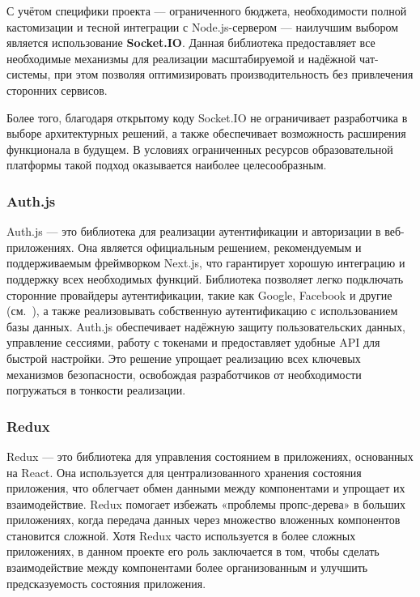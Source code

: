 С учётом специфики проекта — ограниченного бюджета, необходимости полной кастомизации и тесной интеграции с Node.js-сервером — наилучшим выбором является использование \textbf{Socket.IO}. Данная библиотека предоставляет все необходимые механизмы для реализации масштабируемой и надёжной чат-системы, при этом позволяя оптимизировать производительность без привлечения сторонних сервисов.

Более того, благодаря открытому коду Socket.IO не ограничивает разработчика в выборе архитектурных решений, а также обеспечивает возможность расширения функционала в будущем. В условиях ограниченных ресурсов образовательной платформы такой подход оказывается наиболее целесообразным.

\subsubsection*{Auth.js}

Auth.js — это библиотека для реализации аутентификации и авторизации в веб-приложениях. Она является официальным решением, рекомендуемым и поддерживаемым фреймворком Next.js, что гарантирует хорошую интеграцию и поддержку всех необходимых функций. Библиотека позволяет легко подключать сторонние провайдеры аутентификации, такие как Google, Facebook и другие (см.~\cite{nextauth_docs}), а также реализовывать собственную аутентификацию с использованием базы данных. Auth.js обеспечивает надёжную защиту пользовательских данных, управление сессиями, работу с токенами и предоставляет удобные API для быстрой настройки. Это решение упрощает реализацию всех ключевых механизмов безопасности, освобождая разработчиков от необходимости погружаться в тонкости реализации.  

\subsubsection*{Redux}

Redux — это библиотека для управления состоянием в приложениях, основанных на React\cite{redux_docs}. Она используется для централизованного хранения состояния приложения, что облегчает обмен данными между компонентами и упрощает их взаимодействие. Redux помогает избежать «проблемы пропс-дерева» в больших приложениях, когда передача данных через множество вложенных компонентов становится сложной. Хотя Redux часто используется в более сложных приложениях, в данном проекте его роль заключается в том, чтобы сделать взаимодействие между компонентами более организованным и улучшить предсказуемость состояния приложения.

